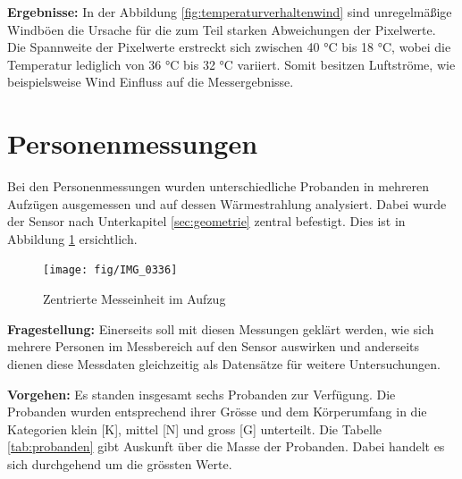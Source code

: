 \textbf{Ergebnisse:} In der Abbildung \ref{fig:temperaturverhaltenwind} sind unregelmäßige Windböen die Ursache für die zum Teil starken Abweichungen der Pixelwerte. Die Spannweite der Pixelwerte erstreckt sich zwischen 40 °C bis 18 °C, wobei die Temperatur lediglich von 36 °C bis 32 °C variiert. Somit besitzen Luftströme, wie beispielsweise Wind Einfluss auf die Messergebnisse. 

\newpage
\section{Personenmessungen}
Bei den Personenmessungen wurden unterschiedliche Probanden in mehreren Aufzügen ausgemessen und auf dessen Wärmestrahlung analysiert. Dabei wurde der Sensor nach Unterkapitel \ref{sec:geometrie} zentral befestigt. Dies ist in Abbildung \ref{fig:img0336} ersichtlich.

\begin{figure}[H]
	\centering
	\texttt{[image: fig/IMG\_0336]}
	\caption[Zentrierte Messeinheit im Aufzug]{Zentrierte Messeinheit im Aufzug}
	\label{fig:img0336}
\end{figure}

\textbf{Fragestellung:} Einerseits soll mit diesen Messungen geklärt werden, wie sich mehrere Personen im Messbereich auf den Sensor auswirken und anderseits dienen diese Messdaten gleichzeitig als Datensätze für weitere Untersuchungen.

\textbf{Vorgehen:} Es standen insgesamt sechs Probanden zur Verfügung. Die Probanden wurden entsprechend ihrer Grösse und dem Körperumfang in die Kategorien klein [K], mittel [N] und gross [G] unterteilt. Die Tabelle \ref{tab:probanden} gibt Auskunft über die Masse der Probanden. Dabei handelt es sich durchgehend um die grössten Werte. 

